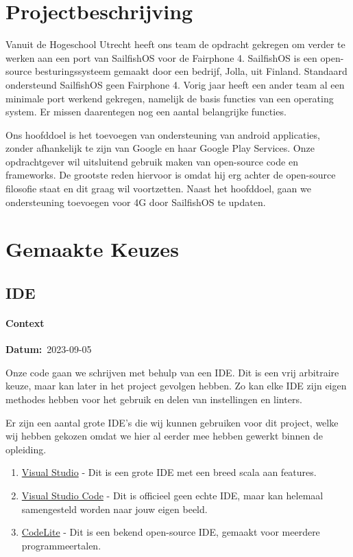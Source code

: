 \documentclass[a4paper]{report}
\newcommand{\personalbox}{
  \begin{tcolorbox}[hbox, colback=green!5!white,colframe=green!75!black,
    left=.1mm, right=.1mm, top=.1mm, bottom=.1mm, fontupper=\scriptsize\sffamily]
    Persoonlijke Keuze
  \end{tcolorbox}
}
\newcommand{\personalchoice}[1]{
  \section[ #1 ]{#1~\mbox{\raisebox{-2.5pt}{\personalbox}}}
}
\newcommand{\timestamp}[1]{
  \mbox{\scriptsize \textbf{Datum:} #1} \smallbreak
}
\begin{document}
\begingroup
\let\clearpage\relax
\chapter{Projectbeschrijving}
Vanuit de Hogeschool Utrecht heeft ons team de opdracht gekregen om verder te werken aan een port van SailfishOS voor de Fairphone 4.
SailfishOS is een open-source besturingssysteem gemaakt door een bedrijf, Jolla, uit Finland. Standaard ondersteund SailfishOS geen Fairphone 4.
Vorig jaar heeft een ander team al een minimale port werkend gekregen, namelijk de basis functies van een operating system. Er missen daarentegen nog een aantal belangrijke functies.
\par \smallskip
Ons hoofddoel is het toevoegen van ondersteuning van android applicaties, zonder afhankelijk te zijn van Google en haar Google Play Services\texttrademark. 
Onze opdrachtgever wil uitsluitend gebruik maken van open-source code en frameworks. De grootste reden hiervoor is omdat hij erg achter de open-source filosofie staat en dit graag wil voortzetten.
Naast het hoofddoel, gaan we ondersteuning toevoegen voor 4G door SailfishOS te updaten.
\endgroup

\chapter{Gemaakte Keuzes}
\personalchoice{IDE}
\subsubsection{Context}
\timestamp{2023-09-05}
Onze code gaan we schrijven met behulp van een IDE. Dit is een vrij arbitraire keuze, maar kan later in het project gevolgen hebben. 
Zo kan elke IDE zijn eigen methodes hebben voor het gebruik en delen van instellingen en linters. 
\par\smallskip
Er zijn een aantal grote IDE's die wij kunnen gebruiken voor dit project, welke wij hebben gekozen omdat we hier al eerder mee hebben gewerkt binnen de opleiding.
\begin{enumerate}
  \item \href{https://visualstudio.microsoft.com/}{Visual Studio} - Dit is een grote IDE met een breed scala aan features.
  \item \href{https://code.visualstudio.com/}{Visual Studio Code} - Dit is officieel geen echte IDE, maar kan helemaal samengesteld worden naar jouw eigen beeld.
  \item \href{https://codelite.org/}{CodeLite} - Dit is een bekend open-source IDE, gemaakt voor meerdere programmeertalen.
\end{enumerate}
\end{document}

